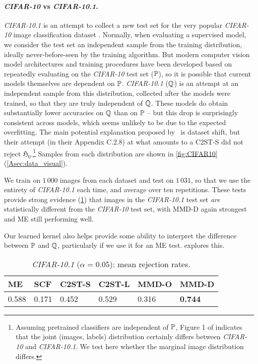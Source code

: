 \documentclass{article}
\newcommand{\nullhyp}{\mathfrak{H}_0}
\begin{document}
\vspace{-1.5ex}\paragraph{\emph{CIFAR-10} vs \emph{CIFAR-10.1}.}
\emph{CIFAR-10.1} \citep{recht:imagenet} is an attempt to collect a new test set for the very popular \emph{CIFAR-10} image classification dataset \citep{cifar10}.
Normally, when evaluating a supervised model,
we consider the test set an independent sample from the training distribution, ideally never-before-seen by the training algorithm.
But modern computer vision model architectures and training procedures have been developed based on repeatedly evaluating on the \emph{CIFAR-10} test set ($\P$),
so it is possible that current models themselves are dependent on $\P$.
\emph{CIFAR-10.1} ($\Q$) is an attempt at an independent sample from this distribution, collected after the models were trained, so that they are truly independent of $\Q$.
These models do obtain substantially lower accuracies on $\Q$ than on $\P$ -- but this drop is surprisingly consistent across models, which seems unlikely to be due to the expected overfitting.
The main potential explanation proposed by \citeauthor{recht:imagenet}\ is dataset shift,
but their attempt (in their Appendix C.2.8) at what amounts to a C2ST-S did not reject $\nullhyp$.\footnote{Assuming pretrained classifiers are independent of $\P$, Figure 1 of \citet{recht:imagenet} indicates that the joint (images, labels) distribution certainly differs between \emph{CIFAR-10} and \emph{CIFAR-10.1}. We test here whether the marginal image distribution differs.}
Samples from each distribution are shown in \cref{fig:CIFAR10} (\cref{Asec:data_visual}).

We train on $1\,000$ images from each dataset and test on $1\,031$, so that we use the entirety of \emph{CIFAR-10.1} each time, and average over ten repetitions.
These tests provide strong evidence (\cref{tab:cifar10_RES}) that images in the \emph{CIFAR-10.1} test set \emph{are} statistically different from the \emph{CIFAR-10} test set,
with MMD-D again strongest
and ME still performing well.

Our learned kernel also helps provide some ability to interpret the difference between $\P$ and $\Q$,
particularly if we use it for an ME test.
 explores this.


\begin{table}[t!]
  \centering
  \footnotesize
  \caption{\emph{CIFAR-10.1} ($\alpha=0.05$): mean rejection rates.}
  \vspace{1mm}
    \begin{tabular}{llllll}
    \toprule
ME & SCF & C2ST-S & C2ST-L & MMD-O & MMD-D \\
    \midrule
0.588 & 0.171 & 0.452 & 0.529 & 0.316 & {\bf 0.744} \\
    \bottomrule
    \end{tabular}\label{tab:cifar10_RES}\vspace{-1em}
\end{table}
\end{document}
